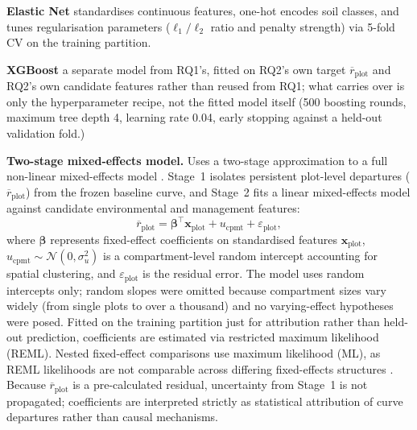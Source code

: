 \documentclass[11pt,a4paper]{report}
\begin{document}
\begin{enumerate*}[label=(\roman*)]
\item \textbf{Elastic Net} standardises continuous features, one-hot encodes soil classes, and tunes regularisation parameters ($\ell_1/\ell_2$ ratio and penalty strength) via 5-fold CV on the training partition.
\item \textbf{XGBoost} a separate model from RQ1's, fitted on RQ2's own target
  $\overline{r}_{\text{plot}}$ and RQ2's own candidate features rather than reused from RQ1;
  what carries over is only the hyperparameter recipe, not the fitted model itself (500 boosting
  rounds, maximum tree depth 4, learning rate 0.04, early stopping against a held-out validation fold.) %
\item \textbf{Two-stage mixed-effects model.} Uses a two-stage approximation to a full non-linear mixed-effects model \citep{socha2016Assessment_C2_CR}. Stage~1 isolates persistent plot-level departures ($\overline{r}_{\text{plot}}$) from the frozen baseline curve, and Stage~2 fits a linear mixed-effects model against candidate environmental and management features:
\begin{equation}
\overline{r}_{\text{plot}} = \boldsymbol{\beta}^{\top}\mathbf{x}_{\text{plot}} + u_{\text{cpmt}} + \varepsilon_{\text{plot}},
\label{eq:mixed-effects}
\end{equation}
where $\boldsymbol{\beta}$ represents fixed-effect coefficients on standardised features $\mathbf{x}_{\text{plot}}$, $u_{\text{cpmt}} \sim \mathcal{N}(0, \sigma_u^2)$ is a compartment-level random intercept accounting for spatial clustering, and $\varepsilon_{\text{plot}}$ is the residual error. The model uses random intercepts only; random slopes were omitted because compartment sizes vary widely (from single plots to over a thousand) and no varying-effect hypotheses were posed. Fitted on the training partition just for attribution rather than held-out prediction, coefficients are estimated via restricted maximum likelihood (REML). Nested fixed-effect comparisons use maximum likelihood (ML), as REML likelihoods are not comparable across differing fixed-effects structures \citep{pinheiro2000Mixed_C5_EVAL}. Because $\overline{r}_{\text{plot}}$ is a pre-calculated residual, uncertainty from Stage~1 is not propagated; coefficients are interpreted strictly as statistical attribution of curve departures rather than causal mechanisms.
\end{enumerate*}
\end{document}
